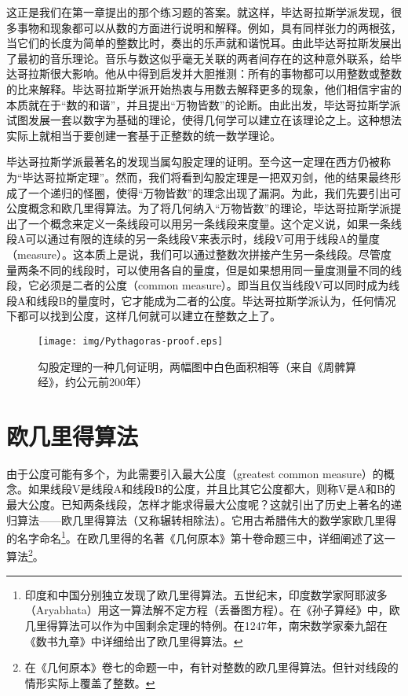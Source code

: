 \documentclass[UTF8]{article}
\begin{document}
这正是我们在第一章提出的那个练习题的答案。就这样，毕达哥拉斯学派发现，很多事物和现象都可以从数的方面进行说明和解释。例如，具有同样张力的两根弦，当它们的长度为简单的整数比时，奏出的乐声就和谐悦耳。由此毕达哥拉斯发展出了最初的音乐理论。音乐与数这似乎毫无关联的两者间存在的这种意外联系，给毕达哥拉斯很大影响。他从中得到启发并大胆推测：所有的事物都可以用整数或整数的比来解释。毕达哥拉斯学派开始热衷与用数去解释更多的现象，他们相信宇宙的本质就在于“数的和谐”，并且提出“万物皆数”的论断。由此出发，毕达哥拉斯学派试图发展一套以数字为基础的理论，使得几何学可以建立在该理论之上。这种想法实际上就相当于要创建一套基于正整数的统一数学理论。

毕达哥拉斯学派最著名的发现当属勾股定理的证明。至今这一定理在西方仍被称为“毕达哥拉斯定理”。然而，我们将看到勾股定理是一把双刃剑，他的结果最终形成了一个递归的怪圈，使得“万物皆数”的理念出现了漏洞。为此，我们先要引出可公度概念和欧几里得算法。为了将几何纳入“万物皆数”的理论，毕达哥拉斯学派提出了一个概念来定义一条线段可以用另一条线段来度量。这个定义说，如果一条线段A可以通过有限的连续的另一条线段V来表示时，线段V可用于线段A的量度（measure）。这本质上是说，我们可以通过整数次拼接产生另一条线段。尽管度量两条不同的线段时，可以使用各自的量度，但是如果想用同一量度测量不同的线段，它必须是二者的公度（common measure）。即当且仅当线段V可以同时成为线段A和线段B的量度时，它才能成为二者的公度。毕达哥拉斯学派认为，任何情况下都可以找到公度，这样几何就可以建立在整数之上了。

\begin{figure}[htbp]
 \centering
 \texttt{[image: img/Pythagoras-proof.eps]}
 \caption{勾股定理的一种几何证明，两幅图中白色面积相等（来自《周髀算经》，约公元前200年）}
 \label{fig:Pythagoras-proof}
\end{figure}

\section{欧几里得算法}

由于公度可能有多个，为此需要引入最大公度（greatest common measure）的概念。如果线段V是线段A和线段B的公度，并且比其它公度都大，则称V是A和B的最大公度。已知两条线段，怎样才能求得最大公度呢？这就引出了历史上著名的递归算法——欧几里得算法（又称辗转相除法）。它用古希腊伟大的数学家欧几里得的名字命名\footnote{印度和中国分别独立发现了欧几里得算法。五世纪末，印度数学家阿耶波多（Aryabhata）用这一算法解不定方程（丢番图方程）。在《孙子算经》中，欧几里得算法可以作为中国剩余定理的特例。在1247年，南宋数学家秦九韶在《数书九章》中详细给出了欧几里得算法。}。在欧几里得的名著《几何原本》第十卷命题三中\cite{Elements}，详细阐述了这一算法\footnote{在《几何原本》卷七的命题一中，有针对整数的欧几里得算法。但针对线段的情形实际上覆盖了整数。}。
\end{document}
